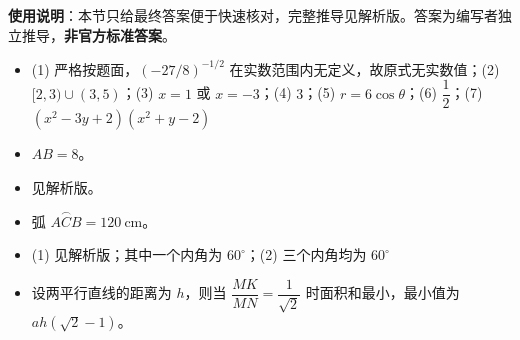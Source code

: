 
\begin{gknotice}
\textbf{使用说明}：本节只给最终答案便于快速核对，完整推导见解析版。答案为编写者独立推导，\textbf{非官方标准答案}。
\end{gknotice}

\begin{itemize}[leftmargin=2.6em]
  \item[\textbf{1.}] (1) 严格按题面，$(-27/8)^{-1/2}$ 在实数范围内无定义，故原式无实数值；(2) $[2,3)\cup(3,5)$；(3) $x=1$ 或 $x=-3$；(4) $3$；(5) $r=6\cos\theta$；(6) $\dfrac12$；(7) $(x^2-3y+2)(x^2+y-2)$
  \item[\textbf{2.}] $AB=8$。
  \item[\textbf{3.}] 见解析版。
  \item[\textbf{4.}] 弧 $\overset{\frown}{ACB}=120\ \mathrm{cm}$。
  \item[\textbf{5.}] (1) 见解析版；其中一个内角为 $60^\circ$；(2) 三个内角均为 $60^\circ$
  \item[\textbf{6.}] 设两平行直线的距离为 $h$，则当 $\dfrac{MK}{MN}=\dfrac1{\sqrt2}$ 时面积和最小，最小值为 $ah(\sqrt2-1)$。
\end{itemize}
